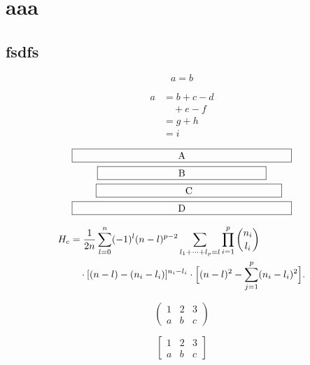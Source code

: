 \documentclass[12pt,ngerman]{scrreprt}
\begin{document}
\chapter{aaa}
\section{fsdfs}

\begin{equation*}
a=b
\end{equation*}

\begin{equation}\label{xx} %
\begin{split}
a& =b+c-d\\
& \quad +e-f\\
& =g+h\\
& =i
\end{split}
\end{equation}

\begin{multline}
\framebox[.65\columnwidth]{A}\\
\framebox[.5\columnwidth]{B}\\
\shoveright{\framebox[.55\columnwidth]{C}}\\
\framebox[.65\columnwidth]{D}
\end{multline}


\begin{equation}\label{e:barwq}\begin{split}
H_c&=\frac{1}{2n} \sum^n_{l=0}(-1)^{l}(n-{l})^{p-2}
\sum_{l _1+\dots+ l _p=l}\prod^p_{i=1} \binom{n_i}{l _i}\\
&\quad\cdot[(n-l )-(n_i-l _i)]^{n_i-l _i}\cdot
\Bigl[(n-l )^2-\sum^p_{j=1}(n_i-l _i)^2\Bigr].
\end{split}\end{equation}

\begin{equation}
\begin{pmatrix}
1 & 2 & 3\\
a & b & c
\end{pmatrix}
\end{equation}

\begin{equation}
\begin{bmatrix}
1 & 2 & 3\\
a & b & c
\end{bmatrix}
\end{equation}
\end{document}
